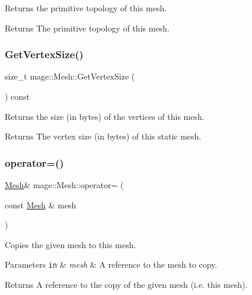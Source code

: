 Returns the primitive topology of this mesh.

\begin{DoxyReturn}{Returns}
The primitive topology of this mesh. 
\end{DoxyReturn}
\hypertarget{classmage_1_1_mesh_a2421eac892ef5fd6db21d8214c02e774}{}\label{classmage_1_1_mesh_a2421eac892ef5fd6db21d8214c02e774} 
\subsubsection{\texorpdfstring{Get\+Vertex\+Size()}{GetVertexSize()}}
{\footnotesize\ttfamily size\+\_\+t mage\+::\+Mesh\+::\+Get\+Vertex\+Size (\begin{DoxyParamCaption}{ }\end{DoxyParamCaption}) const}

Returns the size (in bytes) of the vertices of this mesh.

\begin{DoxyReturn}{Returns}
The vertex size (in bytes) of this static mesh. 
\end{DoxyReturn}
\hypertarget{classmage_1_1_mesh_a5baf961af32b379671a59a082492bc5e}{}\label{classmage_1_1_mesh_a5baf961af32b379671a59a082492bc5e} 
\subsubsection{\texorpdfstring{operator=()}{operator=()}\hspace{0.1cm}{\footnotesize\ttfamily [1/2]}}
{\footnotesize\ttfamily \hyperlink{classmage_1_1_mesh}{Mesh}\& mage\+::\+Mesh\+::operator= (\begin{DoxyParamCaption}\item[{const \hyperlink{classmage_1_1_mesh}{Mesh} \&}]{mesh }\end{DoxyParamCaption})\hspace{0.3cm}{\ttfamily [delete]}}

Copies the given mesh to this mesh.


\begin{DoxyParams}[1]{Parameters}
\mbox{\tt in}  & {\em mesh} & A reference to the mesh to copy. \\
\hline
\end{DoxyParams}
\begin{DoxyReturn}{Returns}
A reference to the copy of the given mesh (i.\+e. this mesh). 
\end{DoxyReturn}
\hypertarget{classmage_1_1_mesh_a28e437196db171b2df1c4bcf3df07a63}{}\label{classmage_1_1_mesh_a28e437196db171b2df1c4bcf3df07a63} 
